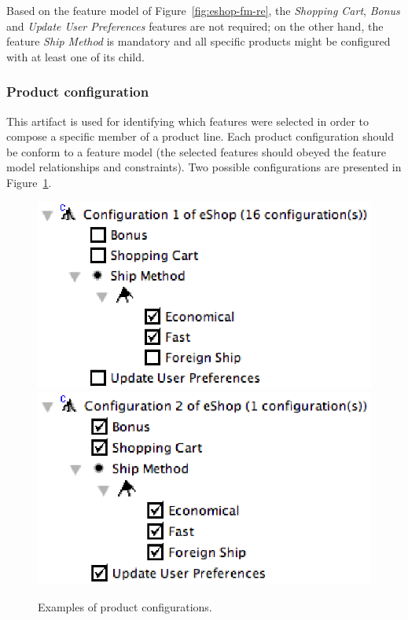 \documentclass{acm_proc_article-sp}
\begin{document}
Based on the feature model of Figure~\ref{fig:eshop-fm-re}, the \emph{Shopping 
Cart}, \emph{Bonus} and \emph{Update User Preferences} features are not required; on the other hand, the feature \emph{Ship Method} is mandatory and all specific products might be configured with at least one of its child.  

\subsubsection{Product configuration}

This artifact is used for identifying which features were selected in order to compose a specific member of a product line. Each product configuration should be conform to a feature model (the selected features should obeyed the feature model relationships and constraints). Two possible configurations are presented in Figure~\ref{fig:product-config-01-02}.  

\begin{figure}[t]
  \centerline{
    \mbox{\includegraphics[scale=0.4]{img/pc-01.eps}}
    \mbox{\includegraphics[scale=0.4]{img/pc-02.eps}}
  }
  \caption{Examples of product configurations.}
  \label{fig:product-config-01-02}
  \end{figure}
  
\end{document}
